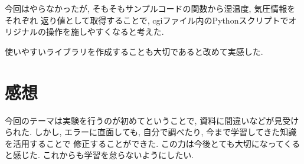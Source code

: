 \documentclass[titlepage]{jsarticle}
\begin{document}
    今回はやらなかったが, そもそもサンプルコードの関数から湿温度, 気圧情報をそれぞれ
    返り値として取得することで, cgiファイル内のPythonスクリプトでオリジナルの操作を施しやすくなると考えた.

    使いやすいライブラリを作成することも大切であると改めて実感した.

\section{感想}
    今回のテーマは実験を行うのが初めてということで, 資料に間違いなどが見受けられた.
    しかし, エラーに直面しても, 自分で調べたり, 今まで学習してきた知識を活用することで
    修正することができた. この力は今後とても大切になってくると感じた.
    これからも学習を怠らないようにしたい.
\end{document}

